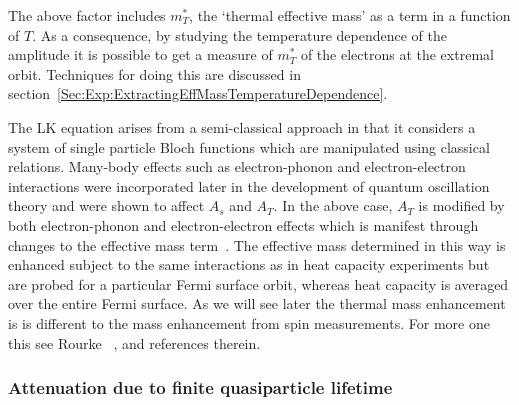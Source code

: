 The above factor includes $m^*_T$, the `thermal effective mass' as a term in a function of $T$. As a consequence, by studying the temperature dependence of the amplitude it is possible to get a measure of $m^*_T$ of the electrons at the extremal orbit. Techniques for doing this are discussed in section~\ref{Sec:Exp:ExtractingEffMassTemperatureDependence}.

The \ac{LK} equation arises from a semi-classical approach in that it considers a system of single particle Bloch functions which are manipulated using classical relations. Many-body effects such as electron-phonon and electron-electron interactions were incorporated later in the development of quantum oscillation theory and were shown to affect $A_s$ and $A_T$. In the above case, $A_T$ is modified by both electron-phonon and electron-electron effects which is manifest through changes to the effective mass term~\cite{Schoenberg1984}. The effective mass determined in this way is enhanced subject to the same interactions as in heat capacity experiments but are probed for a particular Fermi surface orbit, whereas heat capacity is averaged over the entire Fermi surface. As we will see later the thermal mass enhancement is is different to the mass enhancement from spin measurements. For more one this see Rourke \etal~\cite{Rourke2010b}, \cite{Schoenberg1984} and references therein.

\subsubsection{Attenuation due to finite quasiparticle lifetime}

